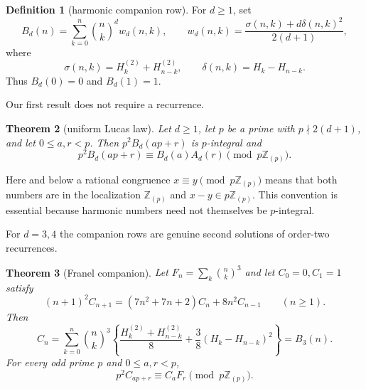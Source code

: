 \documentclass[11pt,reqno]{amsart}
\newtheorem{theorem}{Theorem}[section]
\theoremstyle{definition}
\newtheorem{definition}[theorem]{Definition}
\theoremstyle{remark}
\newcommand{\Zp}{\mathbb Z_{(p)}}
\newcommand{\bin}[2]{\binom{#1}{#2}}
\newcommand{\Hd}[2]{H_{#1}^{(#2)}}
\newcommand{\Ad}[2]{A_{#1}(#2)}
\newcommand{\Bd}[2]{B_{#1}(#2)}
\begin{document}
\begin{definition}[harmonic companion row]\label{def:Bd}
For $d\geq1$, set
\begin{equation}\label{eq:Bd}
 \Bd dn=\sum_{k=0}^n\bin nk^d w_d(n,k),\qquad
 w_d(n,k)=\frac{\sigma(n,k)+d\delta(n,k)^2}{2(d+1)},
\end{equation}
where
\begin{equation}\label{eq:sigdel}
 \sigma(n,k)=\Hd k2+\Hd{n-k}2,
 \qquad \delta(n,k)=H_k-H_{n-k}.
\end{equation}
Thus $B_d(0)=0$ and $B_d(1)=1$.
\end{definition}

Our first result does not require a recurrence.

\begin{theorem}[uniform Lucas law]\label{thm:universal}
Let $d\geq1$, let $p$ be a prime with $p\nmid2(d+1)$, and let
$0\leq a,r<p$.  Then $p^2B_d(ap+r)$ is $p$-integral and
\begin{equation}\label{eq:universal}
 p^2\Bd d{ap+r}\equiv \Bd da\Ad dr\pmod {p\Zp}.
\end{equation}
\end{theorem}

Here and below a rational congruence $x\equiv y\pmod{p\Zp}$ means that both
numbers are in the localization $\Zp$ and $x-y\in p\Zp$.  This convention is
essential because harmonic numbers need not themselves be $p$-integral.

For $d=3,4$ the companion rows are genuine second solutions of order-two
recurrences.

\begin{theorem}[Franel companion]\label{thm:franel}
Let $F_n=\sum_k\bin nk^3$ and let $C_0=0,C_1=1$ satisfy
\begin{equation}\label{eq:Frec}
 (n+1)^2C_{n+1}=(7n^2+7n+2)C_n+8n^2C_{n-1}\qquad(n\geq1).
\end{equation}
Then
\begin{equation}\label{eq:Fform}
 C_n=\sum_{k=0}^n\bin nk^3
 \left\{\frac{\Hd k2+\Hd{n-k}2}{8}
       +\frac38(H_k-H_{n-k})^2\right\}=B_3(n).
\end{equation}
For every odd prime $p$ and $0\leq a,r<p$,
\begin{equation}\label{eq:Flucas}
 p^2C_{ap+r}\equiv C_aF_r\pmod {p\Zp}.
\end{equation}
\end{theorem}
\end{document}
